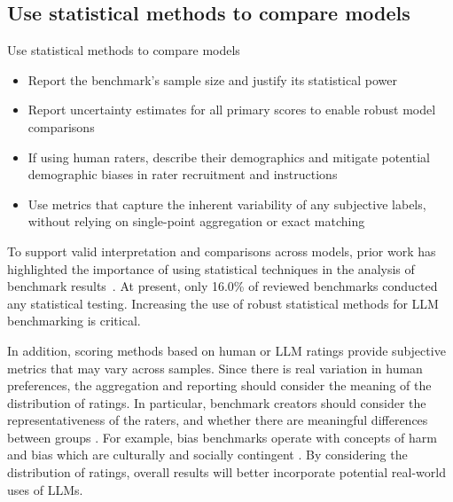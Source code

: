 \subsection{Use statistical methods to compare models}
\begin{checklistbox}{Use statistical methods to compare models}
    \begin{itemize}[leftmargin=5pt, label=\scriptsize$\square$]
     \item Report the benchmark's sample size and justify its statistical power
     \item Report uncertainty estimates for all primary scores to enable robust model comparisons
     \item If using human raters, describe their demographics and mitigate potential demographic biases in rater recruitment and instructions
    \item Use metrics that capture the inherent variability of any subjective labels, without relying on single-point aggregation or exact matching

\end{itemize}
\end{checklistbox}

To support valid interpretation and comparisons across models, prior work has highlighted the importance of using statistical techniques in the analysis of benchmark results~\cite{millerAddingErrorBars2024,mcintoshInadequaciesLargeLanguage2024}. At present, only 16.0\% of reviewed benchmarks conducted any statistical testing. Increasing the use of robust statistical methods for LLM benchmarking is critical.

In addition, scoring methods based on human or LLM ratings provide subjective metrics that may vary across samples. Since there is real variation in human preferences, the aggregation and reporting should consider the meaning of the distribution of ratings. In particular, benchmark creators should consider the representativeness of the raters, and whether there are meaningful differences between groups \cite{kirkPRISMAlignmentDataset2024}. For example, bias benchmarks operate with concepts of harm and bias which are culturally and socially contingent \cite{sahooIndiBiasBenchmarkDataset2024}. By considering the distribution of ratings, overall results will better incorporate potential real-world uses of LLMs.

